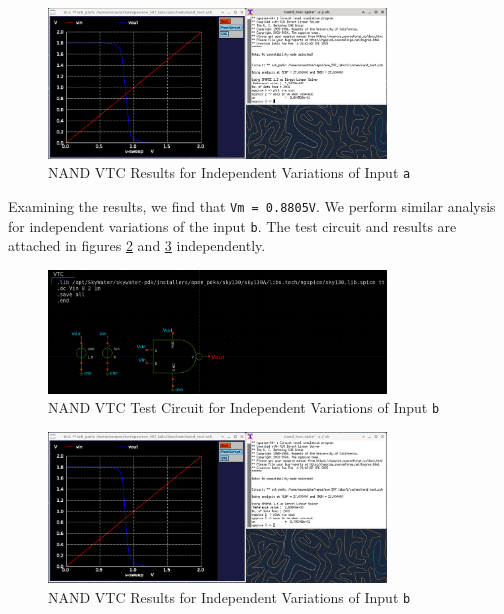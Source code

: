 \documentclass[fleqn]{article}
\begin{document}
	\begin{figure}[H]
		\centerline{\includegraphics[width=0.8\textwidth]{nand_vtc_sweep_va.png}}
		\caption{NAND VTC Results for Independent Variations of Input \texttt{a}}
		\label{fig::nand_vtc_sweep_va}
	\end{figure}
	
	Examining the results, we find that \texttt{Vm = 0.8805V}. We perform similar analysis for independent variations of the input \texttt{b}. The test circuit and results are attached in figures \ref{fig::nand_vtc_test_sweep_vb} and \ref{fig::nand_vtc_sweep_vb} independently.
	
	\begin{figure}[H]
		\centerline{\includegraphics[width=0.8\textwidth]{nand_vtc_test_sweep_vb.png}}
		\caption{NAND VTC Test Circuit for Independent Variations of Input \texttt{b}}
		\label{fig::nand_vtc_test_sweep_vb}
	\end{figure}
	
	\begin{figure}[H]
		\centerline{\includegraphics[width=0.8\textwidth]{nand_vtc_sweep_vb.png}}
		\caption{NAND VTC Results for Independent Variations of Input \texttt{b}}
		\label{fig::nand_vtc_sweep_vb}
	\end{figure}
	
\end{document}
